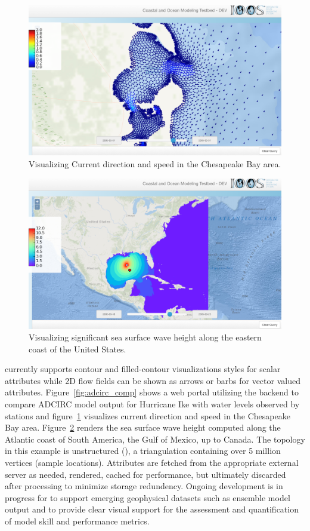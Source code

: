 \begin{figure}[ht!]
  \centering
  \includegraphics[width=0.8\columnwidth]{../figs/vims_selfe_ubaratropic_vbaratropic_chesapeake_bay_crop_695_0_2125_1265}
  \caption{Visualizing Current direction and speed in the
    Chesapeake Bay area.}
  \label{fig:vims_selfe_chesapeake}
\end{figure}
\begin{figure}[ht!]
  \centering
  \includegraphics[width=0.8\columnwidth]{../figs/inundation_tropical_VIMS_SELFE_hurricane_rita_2d_final_run_with_waves_sea_surface_wave_significant_height_crop_695_0_2125_1265}
  \caption{Visualizing significant sea surface wave
    height along the eastern coast of the United States.}
  \label{fig:vims_selfe_ssh}
\end{figure}
\fi

\sciwms{} currently supports contour and filled-contour visualizations
styles for scalar attributes while 2D flow fields can be shown as
arrows or barbs for vector valued
attributes. Figure~\ref{fig:adcirc_comp} shows a web portal utilizing
the \sciwms{} backend to compare ADCIRC model output for Hurricane Ike
with water levels observed by \noaa{} stations and
figure~\ref{fig:vims_selfe_chesapeake} visualizes current direction
and speed in the Chesapeake Bay area. Figure~\ref{fig:vims_selfe_ssh}
renders the sea surface wave height computed along the Atlantic coast
of South America, the Gulf of Mexico, up to Canada. The topology in
this example is unstructured (\ugrid{}), a triangulation containing
over 5 million vertices (sample locations). Attributes are fetched
from the appropriate external server as needed, rendered, cached for
performance, but ultimately discarded after processing to minimize
storage redundency. Ongoing development is in progress for \sciwms{}
to support emerging geophysical datasets such as ensemble model output
and to provide clear visual support for the assessment and
quantification of model skill and performance metrics.
\FloatBarrier
